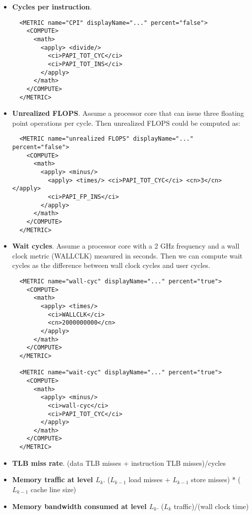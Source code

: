 \documentclass[english]{article}
\begin{document}
\begin{itemize}

\item \textbf{Cycles per instruction}.
  \begin{verbatim}
  <METRIC name="CPI" displayName="..." percent="false">
    <COMPUTE>
      <math>
        <apply> <divide/>
          <ci>PAPI_TOT_CYC</ci>
          <ci>PAPI_TOT_INS</ci>
        </apply>
      </math>
    </COMPUTE>
  </METRIC>
  \end{verbatim}

\item \textbf{Unrealized FLOPS}. Assume a processor core that can issue three floating point operations per cycle.  Then unrealized FLOPS could be computed as:
  \begin{verbatim}
  <METRIC name="unrealized FLOPS" displayName="..." percent="false">
    <COMPUTE>
      <math>
        <apply> <minus/>
          <apply> <times/> <ci>PAPI_TOT_CYC</ci> <cn>3</cn> </apply>
          <ci>PAPI_FP_INS</ci>
        </apply>
      </math>
    </COMPUTE>
  </METRIC>
  \end{verbatim}

\item \textbf{Wait cycles}. Assume a processor core with a 2 GHz frequency and a wall clock metric (WALLCLK) measured in seconds.  Then we can compute wait cycles as the difference between wall clock cycles and user cycles.

  \begin{verbatim}
  <METRIC name="wall-cyc" displayName="..." percent="true">
    <COMPUTE>
      <math>
        <apply> <times/>
          <ci>WALLCLK</ci>
          <cn>2000000000</cn>
        </apply>
      </math>
    </COMPUTE>
  </METRIC>
  
  <METRIC name="wait-cyc" displayName="..." percent="true">
    <COMPUTE>
      <math>
        <apply> <minus/>
          <ci>wall-cyc</ci>
          <ci>PAPI_TOT_CYC</ci>
        </apply>
      </math>
    </COMPUTE>
  </METRIC>
  \end{verbatim}

\item \textbf{TLB miss rate}.  (data TLB misses + instruction TLB misses)/cycles

\item \textbf{Memory traffic at level $L_k$}. ($L_{k-1}$ load misses + $L_{k-1}$ store misses) * ($L_{k-1}$ cache line size)

\item \textbf{Memory bandwidth consumed at level $L_k$}. ($L_k$ traffic)/(wall clock time) 

\end{itemize}
\end{document}
